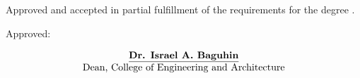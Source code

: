 {\noindent Approved and accepted  in partial fulfillment of the requirements for the degree { \program}.

\bigskip
\noindent Approved:\vspace{0.5in}
\begin{flushleft}
	$$
	\begin{array}{ccc}
		&\underline{\text{\bf Dr. Israel A. Baguhin}}&\\
		&\text{Dean, College of Engineering and Architecture}&\\
		&\text{}
	\end{array}
	$$
\end{flushleft}



}